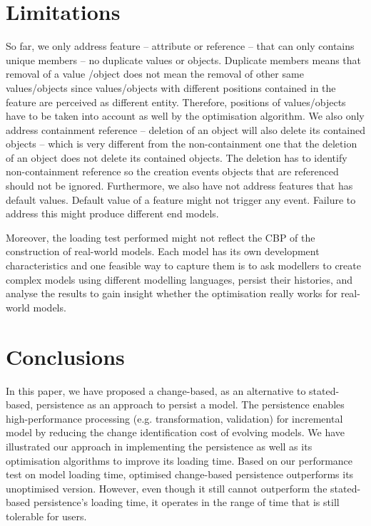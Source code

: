 \documentclass[sigconf]{acmart}
\begin{document}
\section{Limitations}
\label{sec:limitations}
So far, we only address feature -- attribute or reference -- that can only contains unique members -- no duplicate values or objects. Duplicate members means that removal of a value /object does not mean the removal of other same values/objects since values/objects with different positions contained in the feature are perceived as different entity. Therefore, positions of values/objects have to be taken into account as well by the optimisation algorithm. We also only address containment reference -- deletion of an object will also delete its contained objects -- which is very different from the non-containment one that the deletion of an object does not delete its contained objects. The deletion has to identify non-containment reference so the creation events objects that are referenced should not be ignored. Furthermore, we also have not address features that has default values. Default value of a feature might not trigger any event. Failure to address this might produce different end models. 

Moreover, the loading test performed might not reflect the CBP of the construction of real-world models. Each model has its own development characteristics and one feasible way to capture them is to ask modellers to create complex models using different modelling languages, persist their histories, and analyse the results to gain insight whether the optimisation really works for real-world models. 

\section{Conclusions}
\label{sec:conclusions}
In this paper, we have proposed a change-based, as an alternative to stated-based, persistence as an approach to persist a model. The persistence enables high-performance processing (e.g. transformation, validation) for incremental model by reducing the change identification cost of evolving models. We have illustrated our approach in implementing the persistence as well as its optimisation algorithms to improve its loading time. Based on our performance test on model loading time, optimised change-based persistence outperforms its unoptimised version. However, even though it still cannot outperform the stated-based persistence's loading time, it operates in the range of time that is still tolerable for users. 
\end{document}

